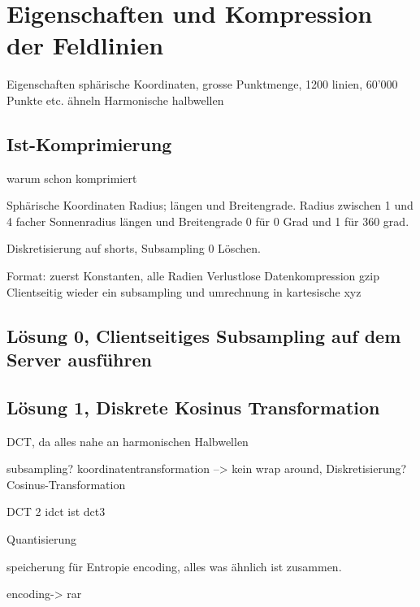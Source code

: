 \section{Eigenschaften und Kompression der Feldlinien}
Eigenschaften
sphärische Koordinaten, grosse Punktmenge, 1200 linien, 60'000 Punkte etc.
ähneln Harmonische halbwellen

\subsection{Ist-Komprimierung} \label{konzept:ist-komprimierung}
warum schon komprimiert

Sphärische Koordinaten Radius; längen und Breitengrade.
Radius zwischen 1 und 4 facher Sonnenradius
längen und Breitengrade 0 für 0 Grad und 1 für 360 grad.

Diskretisierung auf shorts, 
Subsampling
0 Löschen.

Format: zuerst Konstanten, alle Radien
Verlustlose Datenkompression gzip
Clientseitig wieder ein subsampling und umrechnung in kartesische xyz
	
\subsection{Lösung 0, Clientseitiges Subsampling auf dem Server ausführen}

\subsection{Lösung 1, Diskrete Kosinus Transformation}
DCT, da alles nahe an harmonischen Halbwellen

subsampling?
koordinatentransformation --> kein wrap around, 
Diskretisierung?
Cosinus-Transformation

DCT 2
idct ist dct3

Quantisierung

speicherung für Entropie encoding, alles was ähnlich ist zusammen.

encoding-> rar



